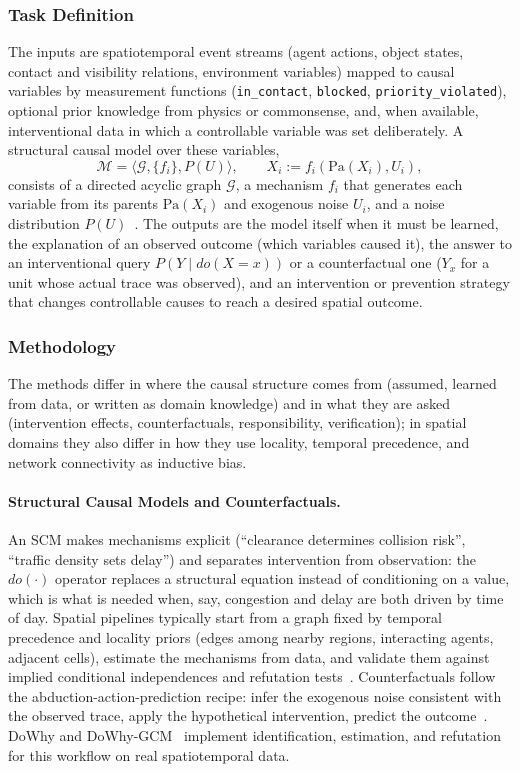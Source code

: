 \subsubsection{Task Definition}
The inputs are spatiotemporal event streams (agent actions, object states, contact and visibility relations, environment variables) mapped to causal variables by measurement functions (\texttt{in\_contact}, \texttt{blocked}, \texttt{priority\_violated}), optional prior knowledge from physics or commonsense, and, when available, interventional data in which a controllable variable was set deliberately. A structural causal model over these variables,
\begin{equation}
    \mathcal{M} = \langle \mathcal{G}, \{f_i\}, P(U) \rangle, \qquad X_i := f_i(\mathrm{Pa}(X_i), U_i),
\end{equation}
consists of a directed acyclic graph $\mathcal{G}$, a mechanism $f_i$ that generates each variable from its parents $\mathrm{Pa}(X_i)$ and exogenous noise $U_i$, and a noise distribution $P(U)$~\cite{Pearl2009Causality}. The outputs are the model itself when it must be learned, the explanation of an observed outcome (which variables caused it), the answer to an interventional query $P(Y \mid do(X=x))$ or a counterfactual one ($Y_{x}$ for a unit whose actual trace was observed), and an intervention or prevention strategy that changes controllable causes to reach a desired spatial outcome.

\subsubsection{Methodology}
The methods differ in where the causal structure comes from (assumed, learned from data, or written as domain knowledge) and in what they are asked (intervention effects, counterfactuals, responsibility, verification); in spatial domains they also differ in how they use locality, temporal precedence, and network connectivity as inductive bias.

\paragraph{Structural Causal Models and Counterfactuals.}
An SCM makes mechanisms explicit (``clearance determines collision risk'', ``traffic density sets delay'') and separates intervention from observation: the $do(\cdot)$ operator replaces a structural equation instead of conditioning on a value, which is what is needed when, say, congestion and delay are both driven by time of day. Spatial pipelines typically start from a graph fixed by temporal precedence and locality priors (edges among nearby regions, interacting agents, adjacent cells), estimate the mechanisms from data, and validate them against implied conditional independences and refutation tests~\cite{Peters2017Elements}. Counterfactuals follow the abduction-action-prediction recipe: infer the exogenous noise consistent with the observed trace, apply the hypothetical intervention, predict the outcome~\cite{Pearl2009Causality}. DoWhy and DoWhy-GCM~\cite{DoWhy2020,Bloebaum2024DoWhyGCM} implement identification, estimation, and refutation for this workflow on real spatiotemporal data.


